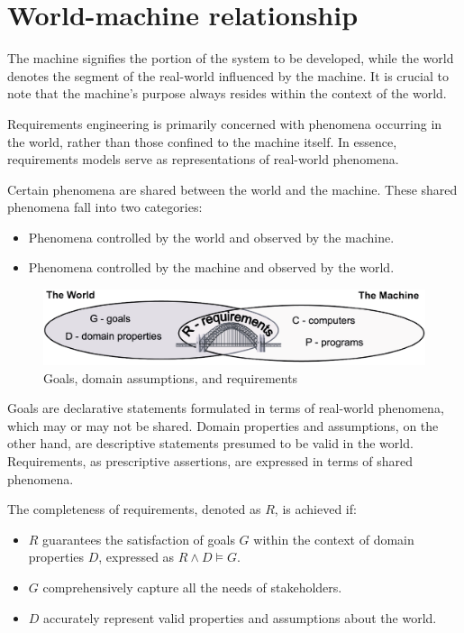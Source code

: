 \documentclass[12pt, a4paper]{report}
\begin{document}
    \section{World-machine relationship}
    The machine signifies the portion of the system to be developed, while the world denotes the segment of the real-world influenced by the machine. 
    It is crucial to note that the machine's purpose always resides within the context of the world.
    
    Requirements engineering is primarily concerned with phenomena occurring in the world, rather than those confined to the machine itself. 
    In essence, requirements models serve as representations of real-world phenomena.
     
    Certain phenomena are shared between the world and the machine. 
    These shared phenomena fall into two categories:
    \begin{itemize}
        \item Phenomena controlled by the world and observed by the machine.
        \item Phenomena controlled by the machine and observed by the world.
    \end{itemize}
    \begin{figure}[H]
        \centering
        \includegraphics[width=0.75\linewidth]{images/worldmachine.png}
        \caption{Goals, domain assumptions, and requirements}
    \end{figure}
    Goals are declarative statements formulated in terms of real-world phenomena, which may or may not be shared.
    Domain properties and assumptions, on the other hand, are descriptive statements presumed to be valid in the world. 
    Requirements, as prescriptive assertions, are expressed in terms of shared phenomena.
      
    The completeness of requirements, denoted as $R$, is achieved if:
    \begin{itemize}
        \item $R$ guarantees the satisfaction of goals $G$ within the context of domain properties $D$, expressed as $R\land D \models G$.
        \item $G$ comprehensively capture all the needs of stakeholders.
        \item $D$ accurately represent valid properties and assumptions about the world.
    \end{itemize}
\end{document}
